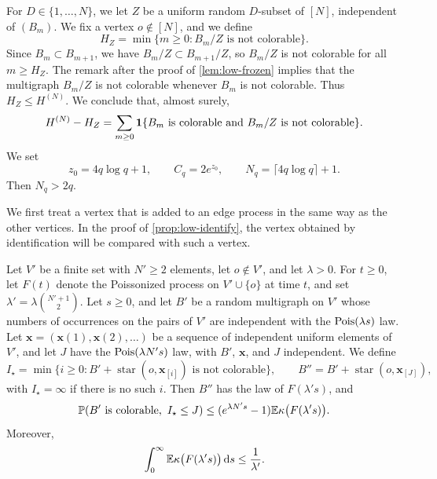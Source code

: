 For $D \in \{1, \dots, N\}$, we let $Z$ be a uniform random $D$-subset of $[N]$, independent of $(B_m)$. We fix a vertex $o \notin [N]$, and we define
\begin{equation*}
H_Z = \min\{m \ge 0 : B_m/Z \text{ is not colorable}\}.
\end{equation*}
Since $B_m \subset B_{m + 1}$, we have $B_m/Z \subset B_{m + 1}/Z$, so $B_m/Z$ is not colorable for all $m \ge H_Z$. The remark after the proof of \cref{lem:low-frozen} implies that the multigraph $B_m/Z$ is not colorable whenever $B_m$ is not colorable. Thus $H_Z \le H^{(N)}$. We conclude that, almost surely,
\begin{equation}\label{eq:low-advance}
H^{(N)} - H_Z = \sum_{m \ge 0} \mathbf 1\{B_m \text{ is colorable and } B_m/Z \text{ is not colorable}\}.
\end{equation}
We set
\begin{equation}\label{eq:low-constants}
z_0 = 4q \log q + 1, \qquad C_q = 2 e^{z_0}, \qquad N_q = \lceil 4q \log q \rceil + 1.
\end{equation}
Then $N_q > 2q$.

We first treat a vertex that is added to an edge process in the same way as the other vertices. In the proof of \cref{prop:low-identify}, the vertex obtained by identification will be compared with such a vertex.

\begin{lemma}\label{lem:low-added}
Let $V'$ be a finite set with $N' \ge 2$ elements, let $o \notin V'$, and let $\lambda > 0$. For $t \ge 0$, let $F(t)$ denote the Poissonized process on $V' \cup \{o\}$ at time $t$, and set $\lambda' = \lambda \binom{N' + 1}{2}$. Let $s \ge 0$, and let $B'$ be a random multigraph on $V'$ whose numbers of occurrences on the pairs of $V'$ are independent with the $\operatorname{Pois}(\lambda s)$ law. Let $\mathbf x = (\mathbf x(1), \mathbf x(2), \dots)$ be a sequence of independent uniform elements of $V'$, and let $J$ have the $\operatorname{Pois}(\lambda N' s)$ law, with $B'$, $\mathbf x$, and $J$ independent. We define
\begin{equation*}
I_\star = \min\bigl\{i \ge 0 : B' + \operatorname{star}(o, \mathbf x_{[i]}) \text{ is not colorable}\bigr\}, \qquad B'' = B' + \operatorname{star}(o, \mathbf x_{[J]}),
\end{equation*}
with $I_\star = \infty$ if there is no such $i$. Then $B''$ has the law of $F(\lambda' s)$, and
\begin{equation}\label{eq:low-added}
\mathbb P(B' \text{ is colorable}, \ I_\star \le J) \le (e^{\lambda N' s} - 1) \mathbb E \kappa\bigl(F(\lambda' s)\bigr).
\end{equation}
Moreover,
\begin{equation}\label{eq:low-added-integral}
\int_0^\infty \mathbb E \kappa\bigl(F(\lambda' s)\bigr) \,\mathrm d s \le \frac{1}{\lambda'}.
\end{equation}
\end{lemma}

